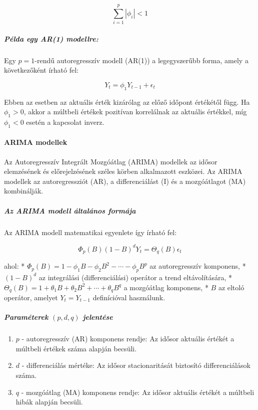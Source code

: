 \documentclass[11pt]{article}
\providecommand{\tightlist}{%
      \setlength{\itemsep}{0pt}\setlength{\parskip}{0pt}}
\begin{document}
\[\sum_{i=1}^p |\phi_i| < 1\]

\subparagraph{Példa egy AR(1)
modellre:}\label{puxe9lda-egy-ar1-modellre}

Egy \(p = 1\)-rendű autoregresszív modell (AR(1)) a legegyszerűbb forma,
amely a következőként írható fel:

\[Y_t = \phi_1 Y_{t-1} + \epsilon_t\]

Ebben az esetben az aktuális érték kizárólag az előző időpont értékétől
függ. Ha \(\phi_1 > 0\), akkor a múltbeli értékek pozitívan korrelálnak
az aktuális értékkel, míg \(\phi_1 < 0\) esetén a kapcsolat inverz.

\paragraph{ARIMA modellek}\label{arima-modellek}

Az Autoregresszív Integrált Mozgóátlag (ARIMA) modellek az idősor
elemzésének és előrejelzésének széles körben alkalmazott eszközei. Az
ARIMA modellek az autoregressziót (AR), a differenciálást (I) és a
mozgóátlagot (MA) kombinálják.

\subparagraph{Az ARIMA modell általános
formája}\label{az-arima-modell-uxe1ltaluxe1nos-formuxe1ja}

Az ARIMA modell matematikai egyenlete így írható fel:

\[\Phi_p(B)(1 - B)^dY_t = \Theta_q(B)\epsilon_t\]

ahol: * \(\Phi_p(B) = 1 - \phi_1 B - \phi_2 B^2 - \cdots - \phi_p B^p\)
az autoregresszív komponens, * \((1 - B)^d\) az integrálási
(differenciálási) operátor a trend eltávolítására, *
\(\Theta_q(B) = 1 + \theta_1 B + \theta_2 B^2 + \cdots + \theta_q B^q\)
a mozgóátlag komponens, * \(B\) az eltoló operátor, amelyet
\(Y_t = Y_{t-1}\) definícióval használunk.

\subparagraph{\texorpdfstring{Paraméterek \((p, d, q)\)
jelentése}{Paraméterek (p, d, q) jelentése}}\label{paramuxe9terek-p-d-q-jelentuxe9se}

\begin{enumerate}
\def\labelenumi{\arabic{enumi}.}
\tightlist
\item
  \(p\) - autoregresszív (AR) komponens rendje: Az idősor aktuális
  értékét a múltbeli értékek száma alapján becsüli.
\item
  \(d\) - differenciálás mértéke: Az idősor stacionaritását biztosító
  differenciálások száma.
\item
  \(q\) - mozgóátlag (MA) komponens rendje: Az idősor aktuális értékét a
  múltbeli hibák alapján becsüli.
\end{enumerate}
\end{document}
